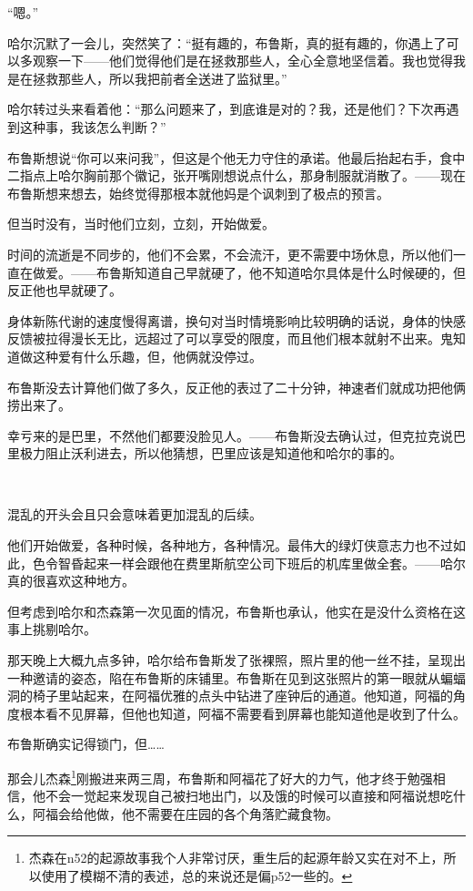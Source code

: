 \documentclass[../main]{subfiles}
\begin{document}
“嗯。”

哈尔沉默了一会儿，突然笑了：“挺有趣的，布鲁斯，真的挺有趣的，你遇上了可以多观察一下——他们觉得他们是在拯救那些人，全心全意地坚信着。我也觉得我是在拯救那些人，所以我把前者全送进了监狱里。”

哈尔转过头来看着他：“那么问题来了，到底谁是对的？我，还是他们？下次再遇到这种事，我该怎么判断？”

布鲁斯想说“你可以来问我”，但这是个他无力守住的承诺。他最后抬起右手，食中二指点上哈尔胸前那个徽记，张开嘴刚想说点什么，那身制服就消散了。——现在布鲁斯想来想去，始终觉得那根本就他妈是个讽刺到了极点的预言。

但当时没有，当时他们立刻，立刻，开始做爱。

时间的流逝是不同步的，他们不会累，不会流汗，更不需要中场休息，所以他们一直在做爱。——布鲁斯知道自己早就硬了，他不知道哈尔具体是什么时候硬的，但反正他也早就硬了。

身体新陈代谢的速度慢得离谱，换句对当时情境影响比较明确的话说，身体的快感反馈被拉得漫长无比，远超过了可以享受的限度，而且他们根本就射不出来。鬼知道做这种爱有什么乐趣，但，他俩就没停过。

布鲁斯没去计算他们做了多久，反正他的表过了二十分钟，神速者们就成功把他俩捞出来了。

幸亏来的是巴里，不然他们都要没脸见人。——布鲁斯没去确认过，但克拉克说巴里极力阻止沃利进去，所以他猜想，巴里应该是知道他和哈尔的事的。

~\

混乱的开头会且只会意味着更加混乱的后续。

他们开始做爱，各种时候，各种地方，各种情况。最伟大的绿灯侠意志力也不过如此，色令智昏起来一样会跟他在费里斯航空公司下班后的机库里做全套。——哈尔真的很喜欢这种地方。

但考虑到哈尔和杰森第一次见面的情况，布鲁斯也承认，他实在是没什么资格在这事上挑剔哈尔。

那天晚上大概九点多钟，哈尔给布鲁斯发了张裸照，照片里的他一丝不挂，呈现出一种邀请的姿态，陷在布鲁斯的床铺里。布鲁斯在见到这张照片的第一眼就从蝙蝠洞的椅子里站起来，在阿福优雅的点头中钻进了座钟后的通道。他知道，阿福的角度根本看不见屏幕，但他也知道，阿福不需要看到屏幕也能知道他是收到了什么。

布鲁斯确实记得锁门，但……

那会儿杰森\footnote[1]{杰森在n52的起源故事我个人非常讨厌，重生后的起源年龄又实在对不上，所以使用了模糊不清的表述，总的来说还是偏p52一些的。}刚搬进来两三周，布鲁斯和阿福花了好大的力气，他才终于勉强相信，他不会一觉起来发现自己被扫地出门，以及饿的时候可以直接和阿福说想吃什么，阿福会给他做，他不需要在庄园的各个角落贮藏食物。
\end{document}
